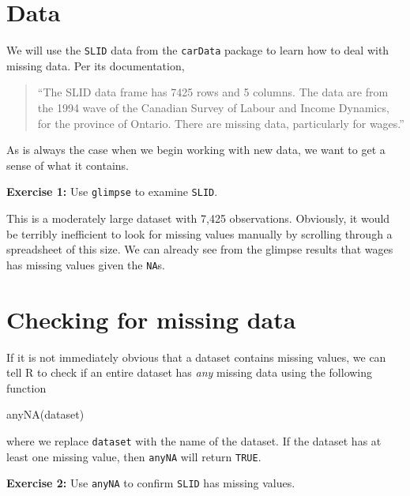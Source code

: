 \documentclass[
]{book}
\makeatletter
\newenvironment{Shaded}{\begin{snugshade}}{\end{snugshade}}
\newcommand{\FunctionTok}[1]{\textcolor[rgb]{0,0,0}{#1}}
\newcommand{\NormalTok}[1]{#1}
\newenvironment{kframe}{%
\medskip{}
\setlength{\fboxsep}{.8em}
 \def\at@end@of@kframe{}%
 \ifinner\ifhmode%
  \def\at@end@of@kframe{\end{minipage}}%
  \begin{minipage}{\columnwidth}%
 \fi\fi%
 \def\FrameCommand##1{\hskip\@totalleftmargin \hskip-\fboxsep
 \colorbox{shadecolor}{##1}\hskip-\fboxsep
     \hskip-\linewidth \hskip-\@totalleftmargin \hskip\columnwidth}%
 \MakeFramed {\advance\hsize-\width
   \@totalleftmargin\z@ \linewidth\hsize
   \@setminipage}}%
 {\par\unskip\endMakeFramed%
 \at@end@of@kframe}
\renewenvironment{Shaded}{\begin{kframe}}{\end{kframe}}
\newenvironment{rmdblock}[1]
  {\begin{shaded*}
  }
  {\end{shaded*}
  }
\newenvironment{learncheck}
  {\begin{rmdblock}{warning}}
  {\end{rmdblock}}
\makeatother
\begin{document}
\hypertarget{data}{%
\section{Data}\label{data}}

We will use the \texttt{SLID} data from the \texttt{carData} package to learn how to deal with missing data. Per its documentation,

\begin{quote}
``The SLID data frame has 7425 rows and 5 columns. The data are from the 1994 wave of the Canadian Survey of Labour and Income Dynamics, for the province of Ontario. There are missing data, particularly for wages.''
\end{quote}

As is always the case when we begin working with new data, we want to get a sense of what it contains.

\begin{learncheck}
\textbf{Exercise 1:} Use \texttt{glimpse} to examine \texttt{SLID}.
\end{learncheck}

This is a moderately large dataset with 7,425 observations. Obviously, it would be terribly inefficient to look for missing values manually by scrolling through a spreadsheet of this size. We can already see from the glimpse results that wages has missing values given the \texttt{NA}s.

\hypertarget{checking-for-missing-data}{%
\section{Checking for missing data}\label{checking-for-missing-data}}

If it is not immediately obvious that a dataset contains missing values, we can tell R to check if an entire dataset has \emph{any} missing data using the following function

\begin{Shaded}
\begin{Highlighting}[]
\FunctionTok{anyNA}\NormalTok{(dataset)}
\end{Highlighting}
\end{Shaded}

where we replace \texttt{dataset} with the name of the dataset. If the dataset has at least one missing value, then \texttt{anyNA} will return \texttt{TRUE}.

\begin{learncheck}
\textbf{Exercise 2:} Use \texttt{anyNA} to confirm \texttt{SLID} has
missing values.
\end{learncheck}
\end{document}
